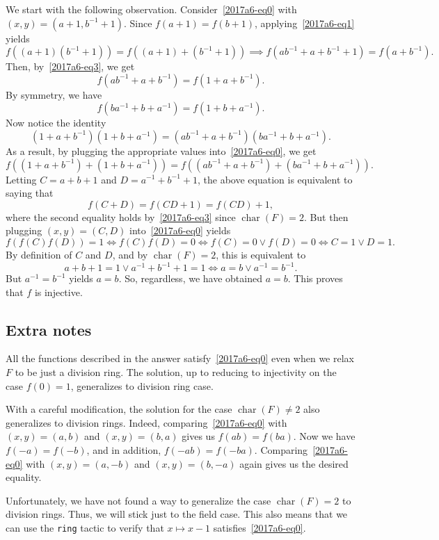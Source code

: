 \documentclass{article}
\DeclareMathOperator{\rchar}{char}
\begin{document}
We start with the following observation.
Consider~\eqref{2017a6-eq0} with $(x, y) = (a + 1, b^{-1} + 1)$.
Since $f(a + 1) = f(b + 1)$, applying~\eqref{2017a6-eq1} yields
\[ f((a + 1)(b^{-1} + 1)) = f((a + 1) + (b^{-1} + 1)) \implies f(ab^{-1} + a + b^{-1} + 1) = f(a + b^{-1}). \]
Then, by~\eqref{2017a6-eq3}, we get
\[ f(ab^{-1} + a + b^{-1}) = f(1 + a + b^{-1}). \]
By symmetry, we have
\[ f(ba^{-1} + b + a^{-1}) = f(1 + b + a^{-1}). \]
Now notice the identity
\[ (1 + a + b^{-1})(1 + b + a^{-1}) = (ab^{-1} + a + b^{-1})(ba^{-1} + b + a^{-1}). \]
As a result, by plugging the appropriate values into~\eqref{2017a6-eq0}, we get
\[ f((1 + a + b^{-1}) + (1 + b + a^{-1})) = f((ab^{-1} + a + b^{-1}) + (ba^{-1} + b + a^{-1})). \]
Letting $C = a + b + 1$ and $D = a^{-1} + b^{-1} + 1$, the above equation is equivalent to saying that
\[ f(C + D) = f(CD + 1) = f(CD) + 1, \]
    where the second equality holds by~\eqref{2017a6-eq3} since $\rchar(F) = 2$.
But then plugging $(x, y) = (C, D)$ into~\eqref{2017a6-eq0} yields
\[ f(f(C) f(D)) = 1 \iff f(C) f(D) = 0 \iff f(C) = 0 \vee f(D) = 0 \iff C = 1 \vee D = 1. \]
By definition of $C$ and $D$, and by $\rchar(F) = 2$, this is equivalent to
\[ a + b + 1 = 1 \vee a^{-1} + b^{-1} + 1 = 1 \iff a = b \vee a^{-1} = b^{-1}. \]
But $a^{-1} = b^{-1}$ yields $a = b$.
So, regardless, we have obtained $a = b$.
This proves that $f$ is injective.



\subsection*{Extra notes}

All the functions described in the answer satisfy~\eqref{2017a6-eq0} even when we relax $F$ to be just a division ring.
The solution, up to reducing to injectivity on the case $f(0) = 1$, generalizes to division ring case.

With a careful modification, the solution for the case $\rchar(F) \neq 2$ also generalizes to division rings.
Indeed, comparing~\eqref{2017a6-eq0} with $(x, y) = (a, b)$ and $(x, y) = (b, a)$ gives us $f(ab) = f(ba)$.
Now we have $f(-a) = f(-b)$, and in addition, $f(-ab) = f(-ba)$.
Comparing~\eqref{2017a6-eq0} with $(x, y) = (a, -b)$ and $(x, y) = (b, -a)$ again gives us the desired equality.

Unfortunately, we have not found a way to generalize the case $\rchar(F) = 2$ to division rings.
Thus, we will stick just to the field case.
This also means that we can use the \texttt{ring} tactic to verify that $x \mapsto x - 1$ satisfies~\eqref{2017a6-eq0}.
\end{document}
